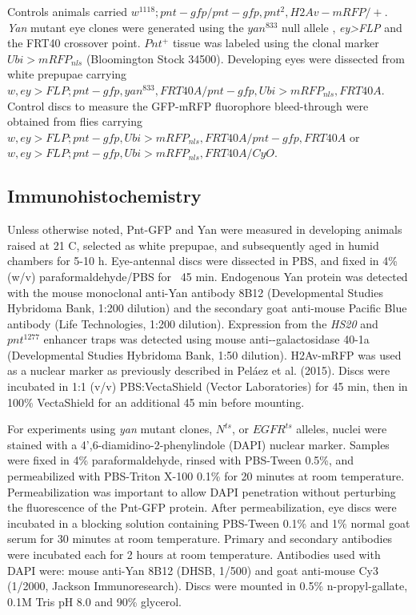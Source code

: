 Controls animals carried $w^{1118}; pnt-gfp/pnt-gfp, pnt^2, H2Av-mRFP/+$. \textit{Yan} mutant eye clones were generated using the $yan^{833}$ null allele \cite{Webber2013}, \textit{ey>FLP} and the FRT40 crossover point. $Pnt^+$ tissue was labeled using the clonal marker $Ubi>mRFP_{nls}$ (Bloomington Stock 34500). Developing eyes were dissected from white prepupae carrying $w, ey>FLP; pnt-gfp, yan^{833}, FRT40A/pnt-gfp, Ubi>mRFP_{nls},FRT40A$. Control discs to measure the GFP-mRFP fluorophore bleed-through were obtained from flies carrying $w, ey>FLP; pnt-gfp, Ubi>mRFP_{nls}, FRT40A/pnt-gfp, FRT40A$ or $w, ey>FLP; pnt-gfp, Ubi>mRFP_{nls}, FRT40A/CyO$.

\subsection{Immunohistochemistry}

Unless otherwise noted, Pnt-GFP and Yan were measured in developing animals raised at 21 \textdegree{}C, selected as white prepupae, and subsequently aged in humid chambers for 5-10 h. Eye-antennal discs were dissected in PBS, and fixed in 4\% (w/v) paraformaldehyde/PBS for ~45 min. Endogenous Yan protein was detected with the mouse monoclonal anti-Yan antibody 8B12 (Developmental Studies Hybridoma Bank, 1:200 dilution) and the secondary goat anti-mouse Pacific Blue antibody (Life Technologies, 1:200 dilution). Expression from the \textit{HS20} and $pnt^{1277}$ enhancer traps was detected using mouse anti-\beta-galactosidase 40-1a (Developmental Studies Hybridoma Bank, 1:50 dilution). H2Av-mRFP was used as a nuclear marker as previously described in Peláez et al. (2015). Discs were incubated in 1:1 (v/v) PBS:VectaShield (Vector Laboratories) for 45 min, then in 100\% VectaShield for an additional 45 min before mounting.

For experiments using \textit{yan} mutant clones, $N^{ts}$, or $EGFR^{ts}$ alleles, nuclei were stained with a 4',6-diamidino-2-phenylindole (DAPI) nuclear marker. Samples were fixed in 4\% paraformaldehyde, rinsed with PBS-Tween 0.5\%, and permeabilized with PBS-Triton X-100 0.1\% for 20 minutes at room temperature. Permeabilization was important to allow DAPI penetration without perturbing the fluorescence of the Pnt-GFP protein. After permeabilization, eye discs were incubated in a blocking solution containing PBS-Tween 0.1\% and 1\% normal goat serum for 30 minutes at room temperature. Primary and secondary antibodies were incubated each for 2 hours at room temperature. Antibodies used with DAPI were: mouse anti-Yan 8B12 (DHSB, 1/500) and goat anti-mouse Cy3 (1/2000, Jackson Immunoresearch). Discs were mounted in 0.5\% n-propyl-gallate, 0.1M Tris pH 8.0 and 90\% glycerol.

